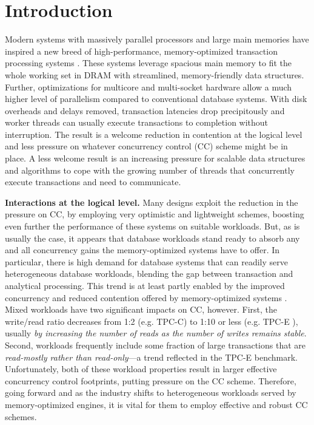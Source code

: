 
\section{Introduction}

Modern systems with massively parallel processors and large main memories have inspired a new breed of high-performance, memory-optimized transaction processing systems \cite{Kallman+08,PandisJHA10,KemperN11,LarsonBDFPZ11,LevandoskiLSSW15,TuZKLM13}. These systems leverage spacious main memory to fit the whole working set in DRAM with streamlined, memory-friendly data structures. Further, optimizations for multicore and multi-socket hardware allow a much higher level of parallelism compared to conventional database systems. With disk overheads and delays removed, transaction latencies drop precipitously and worker threads can usually execute transactions to completion without interruption. The result is a welcome reduction in contention at the logical level and less pressure on whatever concurrency control (CC) scheme might be in place. A less welcome result is an increasing pressure for scalable data structures and algorithms to cope with the growing number of threads that concurrently execute transactions and need to communicate.


\vspace{2mm}
{\bf Interactions at the logical level.} 
Many designs exploit the reduction in the pressure on CC, by employing very optimistic and lightweight schemes, boosting even further the performance of these systems on suitable workloads.
But, as is usually the case, it appears that database workloads stand ready to absorb any and all concurrency gains the memory-optimized systems have to offer. In particular, there is high demand for database systems that can readily serve heterogeneous database workloads, blending the gap between transaction and analytical processing. This trend is at least partly enabled by the improved concurrency and reduced contention offered by memory-optimized systems \cite{Farber+12}. Mixed workloads have two significant impacts on CC, however. First, the write/read ratio decreases from 1:2 (e.g. TPC-C) to 1:10 or less (e.g. TPC-E \cite{Chen+10,TozunPKJA13}), usually {\it by increasing the number of reads as the number of writes remains stable}. 
Second, workloads frequently include some fraction of large transactions that are {\it read-mostly rather than read-only}---a trend reflected in the TPC-E benchmark. Unfortunately, both of these workload properties result in larger effective concurrency control footprints, putting pressure on the CC scheme. 
Therefore, going forward and as the industry shifts to heterogeneous workloads served by memory-optimized engines, it is vital for them to employ effective and robust CC schemes. 


